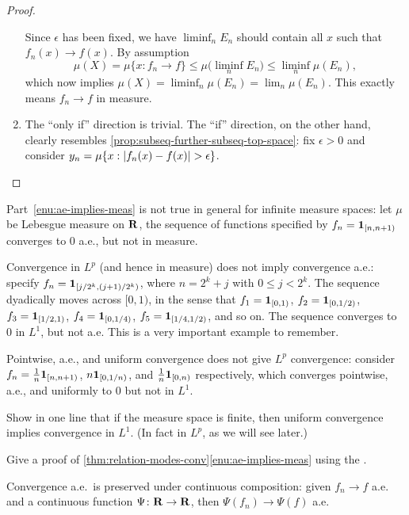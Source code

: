 \begin{proof}
\begin{enumerate}
        Since $\epsilon$ has been fixed, we have $\liminf_n E_n$ should contain all $x$ such that $f_n(x) \to f(x)$. By assumption \[\mu(X) = \mu\{x:f_n \to f\} \leq \mu\bigl(\liminf_n E_n\bigr) \leq \liminf_n \mu(E_n),\] which now implies $\mu(X) = \liminf_n \mu(E_n) = \lim_n \mu(E_n)$. This exactly means $f_n \to f$ in measure.
        \item The ``only if'' direction is trivial. The ``if'' direction, on the other hand, clearly resembles \cref{prop:subseq-further-subseq-top-space}: fix $\epsilon > 0$ and consider $y_n = \mu\{x:\lvert f_n(x) - f(x) \rvert > \epsilon\}$. \qedhere
     \end{enumerate}
\end{proof}

\begin{exa}
    Part~\ref{enu:ae-implies-meas} is not true in general for infinite measure spaces: let $\mu$ be Lebesgue measure on $\mathbf{R}$, the sequence of functions specified by $f_n = \mathbf{1}_{[n,n+1)}$ converges to $0$ a.e., but not in measure.

    Convergence in $L^p$ (and hence in measure) does not imply convergence a.e.: specify $f_n =\mathbf{1}_{[j/2^k,(j+1)/2^k)}$, where $n = 2^k+j$ with $0\leq j < 2^k$. The sequence dyadically moves across $[0,1)$, in the sense that $f_1 = \mathbf{1}_{[0,1)}$, $f_2 = \mathbf{1}_{[0,1/2)}$, $f_3 = \mathbf{1}_{[1/2,1)}$, $f_4 = \mathbf{1}_{[0,1/4)}$, $f_5 = \mathbf{1}_{[1/4,1/2)}$, and so on. The sequence converges to $0$ in $L^1$, but not a.e. This is a very important example to remember.

    Pointwise, a.e., and uniform convergence does not give $L^p$ convergence: consider $f_n = \frac{1}{n} \mathbf{1}_{[n,n+1)}$, $n\mathbf{1}_{[0,1/n)}$, and $\frac{1}{n} \mathbf{1}_{[0,n)}$ respectively, which converges pointwise, a.e., and uniformly to $0$ but not in $L^1$.
\end{exa}

\begin{xca}
    Show in one line that if the measure space is finite, then uniform convergence implies convergence in $L^1$. (In fact in $L^p$, as we will see later.)
\end{xca}

\begin{xca}
    Give a proof of \cref{thm:relation-modes-conv}\ref{enu:ae-implies-meas} using the .
\end{xca}

\begin{fact}
    Convergence a.e.\ is preserved under continuous composition: given $f_n \to f$ a.e. and a continuous function $\Psi\colon \mathbf{R} \to \mathbf{R}$, then $\Psi(f_n)\to \Psi(f)$ a.e.
\end{fact}

